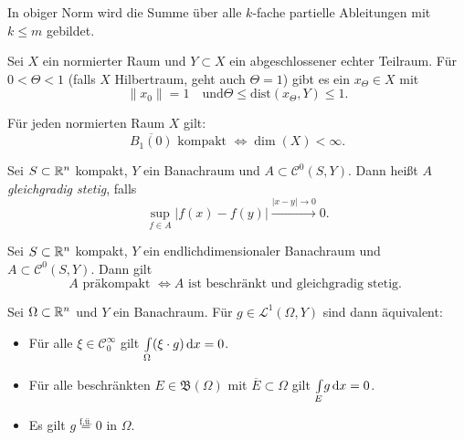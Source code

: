 \documentclass{cheat-sheet}
\newcommand{\Bor}{\mathfrak{B}} %
\newcommand{\Leb}{\mathcal{L}} %
\newcommand{\fue}{\overset{\text{f.ü.}}} %
\newcommand{\dist}{\mathrm{dist}} %
\begin{document}
\begin{bem}
  In obiger Norm wird die Summe über alle $k$-fache partielle Ableitungen mit $k \leq m$ gebildet.
\end{bem}


\begin{satz}
  Sei $X$ ein normierter Raum und $Y \subset X$ ein abgeschlossener echter Teilraum. Für $0 < \Theta < 1$ (falls $X$ Hilbertraum, geht auch $\Theta = 1$) gibt es ein $x_{\Theta} \in X$ mit
  \[ \|x_0\| = 1 \quad \text{und} \Theta \leq \dist(x_{\Theta}, Y) \leq 1. \]
\end{satz}

\begin{satz}
  Für jeden normierten Raum $X$ gilt:
  \[ \overline{B_1(0)} \text{ kompakt } \iff \dim(X) < \infty. \]
\end{satz}

\begin{defn}
  Sei $S \subset \mathbb{R}^n$ kompakt, $Y$ ein Banachraum und $A \subset \mathcal{C}^0(S, Y)$. Dann heißt $A$ \emph{gleichgradig stetig}, falls
  \[ \sup_{f \in A} \left| f(x) - f(y) \right| \xrightarrow{\left| x - y \right| \to 0} 0. \]
\end{defn}

\begin{defn}
  Sei $S \subset \mathbb{R}^n$ kompakt, $Y$ ein endlichdimensionaler Banachraum und $A \subset \mathcal{C}^0(S, Y)$. Dann gilt
  \[ A \text{ präkompakt } \iff A \text{ ist beschränkt und gleichgradig stetig. } \]
\end{defn}

\begin{satz}
  Sei $\Omega \subset \mathbb{R}^n$ und $Y$ ein Banachraum. Für $g \in \Leb^1(\Omega, Y)$ sind dann äquivalent:
  \begin{itemize}
    \item Für alle $\xi \in \mathcal{C}_0^\infty$ gilt ${\textstyle \int\limits_{\Omega}^{}} (\xi \cdot g) \,\mathrm{d} x = 0$.
    \item Für alle beschränkten $E \in \Bor(\Omega)$ mit $\overline{E} \subset \Omega$ gilt ${\textstyle \int\limits_{E}^{}} g \,\mathrm{d} x = 0$.
    \item Es gilt $g \fue= 0$ in $\Omega$.
  \end{itemize}
\end{satz}
\end{document}
